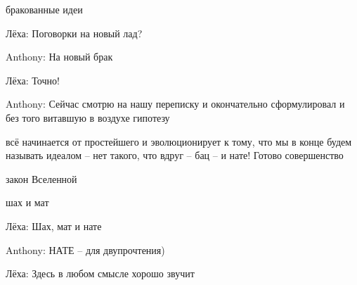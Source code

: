 \begin{miamalist}
  бракованные идеи
  \item[Лёха:] Поговорки на новый лад?
  \item[Anthony:] На новый брак
  \item[Лёха:] Точно!
  \item[Anthony:] Сейчас смотрю на нашу переписку и окончательно сформулировал и без того витавшую в воздухе гипотезу

  всё начинается от простейшего и эволюционирует к тому, что мы в конце будем называть идеалом -- нет такого, что вдруг -- бац -- и нате! Готово совершенство

  закон Вселенной

  шах и мат
  \item[Лёха:] Шах, мат и нате
  \item[Anthony:] НАТЕ -- для двупрочтения)
  \item[Лёха:] Здесь в любом смысле хорошо звучит
\end{miamalist}







